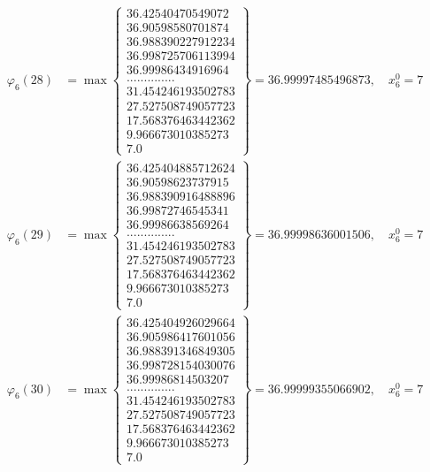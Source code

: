 \documentclass{article}
\begin{document}
\begin{align*}
  
  
  
\varphi_{6}(28) &= \max \left\{ \begin{array}{c}
36.42540470549072 \\
 36.90598580701874 \\
 36.988390227912234 \\
 36.998725706113994 \\
 36.99986434916964 \\
 .............. \\
 31.454246193502783 \\
 27.527508749057723 \\
 17.568376463442362 \\
 9.966673010385273 \\
 7.0
\end{array} \right\} = 36.99997485496873, \quad x_{6}^0 = 7\\
  
  
  
  
\varphi_{6}(29) &= \max \left\{ \begin{array}{c}
36.425404885712624 \\
 36.90598623737915 \\
 36.988390916488896 \\
 36.99872746545341 \\
 36.99986638569264 \\
 .............. \\
 31.454246193502783 \\
 27.527508749057723 \\
 17.568376463442362 \\
 9.966673010385273 \\
 7.0
\end{array} \right\} = 36.99998636001506, \quad x_{6}^0 = 7\\
  
  
  
  
\varphi_{6}(30) &= \max \left\{ \begin{array}{c}
36.425404926029664 \\
 36.905986417601056 \\
 36.988391346849305 \\
 36.998728154030076 \\
 36.99986814503207 \\
 .............. \\
 31.454246193502783 \\
 27.527508749057723 \\
 17.568376463442362 \\
 9.966673010385273 \\
 7.0
\end{array} \right\} = 36.99999355066902, \quad x_{6}^0 = 7\\
  

\end{align*}
\end{document}
